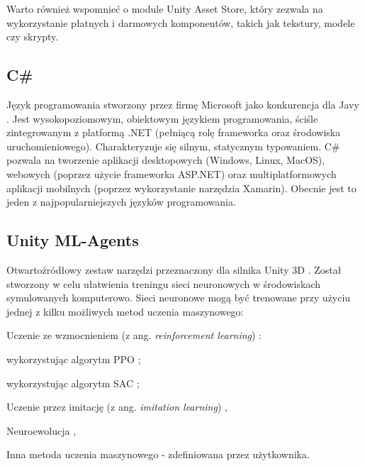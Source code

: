 Warto również wspomnieć o module Unity Asset Store, który zezwala na wykorzystanie płatnych i darmowych komponentów, takich jak tekstury, modele czy skrypty.

\subsection{C\#}
Język programowania stworzony przez firmę Microsoft jako konkurencja dla Javy \cite{csharp:opis}. Jest wysokopoziomowym, obiektowym językiem programowania, ściśle zintegrowanym z platformą .NET (pełniącą rolę frameworka oraz środowiska uruchomieniowego). Charakteryzuje się silnym, statycznym typowaniem. C\# pozwala na tworzenie aplikacji desktopowych (Windows, Linux, MacOS), webowych (poprzez użycie frameworka ASP.NET) oraz multiplatformowych aplikacji mobilnych (poprzez wykorzystanie narzędzia Xamarin). Obecnie jest to jeden z najpopularniejszych języków programowania.

\subsection{Unity ML-Agents}
Otwartoźródłowy zestaw narzędzi przeznaczony dla silnika Unity 3D \cite{unitymla:overview}. Został stworzony w celu ułatwienia treningu sieci neuronowych w środowiskach symulowanych komputerowo. Sieci neuronowe mogą być trenowane przy użyciu jednej z kilku możliwych metod uczenia maszynowego:
\begin{enumerate*}
\item Uczenie ze wzmocnieniem (z ang. \textit{reinforcement learning}) \cite{deepRL:guide}:
\begin{itemize*}
\item wykorzystując algorytm PPO \cite{ppo:opis};
\item wykorzystując algorytm SAC \cite{sac:opis};
\end{itemize*}
\item Uczenie przez imitację (z ang. \textit{imitation learning}) \cite{imitationLearning:article},
\item Neuroewolucja \cite{neuroevolution:primer},
\item Inna metoda uczenia maszynowego - zdefiniowana przez użytkownika.
\end{enumerate*}

